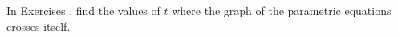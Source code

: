 {\noindent In Exercises}
{, find the values of $t$ where the graph of the parametric equations crosses itself.
}
